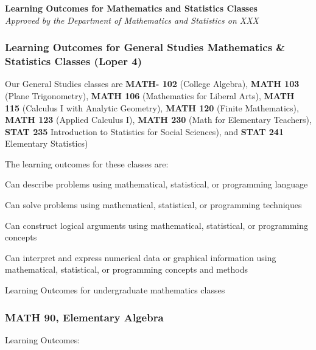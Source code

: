 
\begin{flushleft}
\textbf{Learning Outcomes for Mathematics and Statistics Classes} \\
\vspace{0.1in}
\emph{Approved by the Department of Mathematics and Statistics on XXX}
\end{flushleft}

\subsubsection*{Learning Outcomes for General Studies Mathematics & Statistics Classes (Loper 4)}

Our General Studies classes are \textbf{MATH- 102} (College Algebra),
\textbf{MATH 103} (Plane Trigonometry),
\textbf{MATH 106} (Mathematics for Liberal Arts),
\textbf{MATH 115} (Calculus I with Analytic Geometry),
\textbf{MATH 120} (Finite Mathematics),
\textbf{MATH 123} (Applied Calculus I),
\textbf{MATH 230} (Math for Elementary Teachers),
\textbf{STAT 235} Introduction to  Statistics for  Social Sciences),
and \textbf{STAT 241}  Elementary Statistics)

The learning outcomes for these classes are:

\begin{alphalist}
\item Can describe problems using mathematical, statistical, or programming language
\item Can solve problems using mathematical, statistical, or programming techniques
\item Can construct logical arguments using mathematical, statistical, or programming concepts
\item Can interpret and express numerical data or graphical information using mathematical, statistical, or programming concepts and methods
\end{alphalist}

Learning Outcomes for undergraduate mathematics classes
\subsubsection{MATH 90, Elementary Algebra}

Learning Outcomes:

